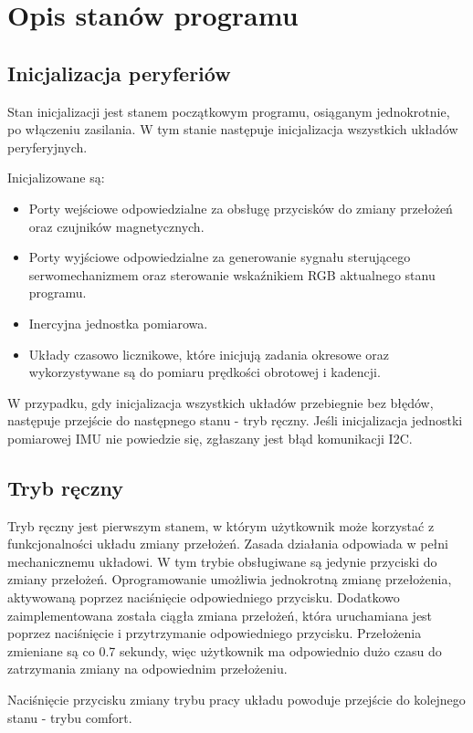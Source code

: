 \section{Opis stanów programu}
\subsection{Inicjalizacja peryferiów}
Stan inicjalizacji jest stanem początkowym programu, osiąganym jednokrotnie, po włączeniu zasilania. W tym stanie następuje inicjalizacja wszystkich układów peryferyjnych. 

Inicjalizowane są:
\begin{itemize}
\item
Porty wejściowe odpowiedzialne za obsługę przycisków do zmiany przełożeń oraz czujników magnetycznych.
\item
Porty wyjściowe odpowiedzialne za generowanie sygnału sterującego serwomechanizmem oraz sterowanie wskaźnikiem RGB aktualnego stanu programu. 
\item
Inercyjna jednostka pomiarowa.
\item
Układy czasowo licznikowe, które inicjują zadania okresowe oraz wykorzystywane są do pomiaru prędkości obrotowej i kadencji.
\end{itemize}

W przypadku, gdy inicjalizacja wszystkich układów przebiegnie bez błędów, następuje przejście do następnego stanu - tryb ręczny. Jeśli inicjalizacja jednostki pomiarowej IMU nie powiedzie się, zgłaszany jest błąd komunikacji I2C. 
\subsection{Tryb ręczny}
Tryb ręczny jest pierwszym stanem, w którym użytkownik może korzystać z funkcjonalności układu zmiany przełożeń. Zasada działania odpowiada w pełni mechanicznemu układowi. W tym trybie obsługiwane są jedynie przyciski do zmiany przełożeń. Oprogramowanie umożliwia jednokrotną zmianę przełożenia, aktywowaną poprzez naciśnięcie odpowiedniego przycisku. Dodatkowo zaimplementowana została ciągła zmiana przełożeń, która uruchamiana jest poprzez naciśnięcie i przytrzymanie odpowiedniego przycisku. Przełożenia zmieniane są co 0.7 sekundy, więc użytkownik ma odpowiednio dużo czasu do zatrzymania zmiany na odpowiednim przełożeniu.

Naciśnięcie przycisku zmiany trybu pracy układu powoduje przejście do kolejnego stanu - trybu comfort.
